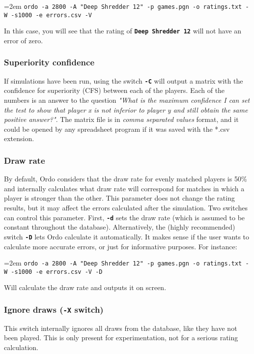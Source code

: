 \documentclass[12pt]{article}
\newcommand{\swtch} [1] {\texttt{\textbf{#1}}}
\newcommand{\cmdln}[1]{
	\par
	\begingroup
		\leftskip=2em
		\addtolength{\rightskip}{0em}
		\noindent \small{\texttt{#1}}
		\par
	\endgroup
}
\begin{document}
\cmdln{ordo -a 2800 -A "Deep Shredder 12" -p games.pgn -o ratings.txt -W -s1000 -e errors.csv -V}

In this case, you will see that the rating of \swtch{Deep Shredder 12} will not have an error of zero.

\subsubsection*{Superiority confidence}

If simulations have been run, using the switch \swtch{-C} will output a matrix with the confidence for superiority (CFS) between each of the players.
Each of the numbers is an answer to the question \textit{"What is the maximum confidence I can set the test to show that player x is not inferior to player y and still obtain the same positive answer?"}.
The matrix file is in \textit{comma separated values} format, and it could be opened by any spreadsheet program if it was saved with the *.csv extension.

\subsubsection*{Draw rate}
By default, Ordo considers that the draw rate for evenly matched players is 50\% and internally calculates what draw rate will correspond for matches in which a player is stronger than the other.
This parameter does not change the rating results, but it may affect the errors calculated after the simulation.
Two switches can control this parameter. 
First, \swtch{-d} sets the draw rate (which is assumed to be constant throughout the database). 
Alternatively, the (highly recommended) switch \swtch{-D} lets Ordo calculate it automatically. 
It makes sense if the user wants to calculate more accurate errors, or just for informative purposes.
For instance:

\cmdln{ordo -a 2800 -A "Deep Shredder 12" -p games.pgn -o ratings.txt -W -s1000 -e errors.csv -V -D}

Will calculate the draw rate and outputs it on screen.

\subsubsection*{Ignore draws (\swtch{-X} switch)}

This switch internally ignores all draws from the database, like they have not been played.
This is only present for experimentation, not for a serious rating calculation.
\end{document}
